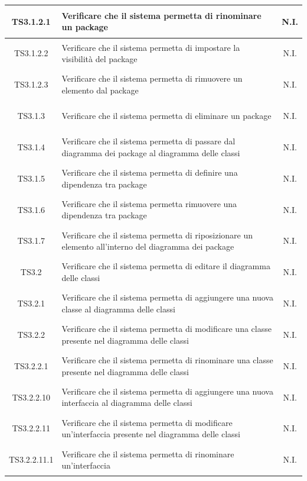 \documentclass[../PianoDiQualifica.tex]{subfiles}
\begin{document}
\begin{longtable}{|c|>{\centering}p{10cm}|c|}
	\hline
	\hypertarget{TS3.1.2.1}{TS3.1.2.1} & Verificare che il sistema permetta di rinominare un package & N.I. \\
	\hline
	\hypertarget{TS3.1.2.2}{TS3.1.2.2} & Verificare che il sistema permetta di impostare la visibilità del package & N.I. \\
	\hline
	\hypertarget{TS3.1.2.3}{TS3.1.2.3} & Verificare che il sistema permetta di rimuovere un elemento dal package & N.I. \\
	\hline
	\hypertarget{TS3.1.3}{TS3.1.3} & Verificare che il sistema permetta di eliminare un package & N.I. \\
	\hline
	\hypertarget{TS3.1.4}{TS3.1.4} & Verificare che il sistema permetta di passare dal diagramma dei package al diagramma delle classi & N.I. \\
	\hline
	\hypertarget{TS3.1.5}{TS3.1.5} & Verificare che il sistema permetta di definire una dipendenza tra package & N.I. \\
	\hline
	\hypertarget{TS3.1.6}{TS3.1.6} & Verificare che il sistema permetta rimuovere una dipendenza tra package & N.I. \\
	\hline
	\hypertarget{TS3.1.7}{TS3.1.7} & Verificare che il sistema permetta di riposizionare un elemento all'interno del diagramma dei package & N.I. \\
	\hline
	\hypertarget{TS3.2}{TS3.2} & Verificare che il sistema permetta di editare il diagramma delle classi & N.I. \\
	\hline
	\hypertarget{TS3.2.1}{TS3.2.1} & Verificare che il sistema permetta di aggiungere una nuova classe al diagramma delle classi & N.I. \\
	\hline
	\hypertarget{TS3.2.2}{TS3.2.2} & Verificare che il sistema permetta di modificare una classe presente nel diagramma delle classi & N.I. \\
	\hline
	\hypertarget{TS3.2.2.1}{TS3.2.2.1} & Verificare che il sistema permetta di rinominare una classe presente nel diagramma delle classi & N.I. \\
	\hline
	\hypertarget{TS3.2.2.10}{TS3.2.2.10} & Verificare che il sistema permetta di aggiungere una nuova interfaccia al diagramma delle classi & N.I. \\
	\hline
	\hypertarget{TS3.2.2.11}{TS3.2.2.11} & Verificare che il sistema permetta di modificare un'interfaccia presente nel diagramma delle classi & N.I. \\
	\hline
	\hypertarget{TS3.2.2.11.1}{TS3.2.2.11.1} & Verificare che il sistema permetta di rinominare un'interfaccia & N.I. \\

\end{longtable}
\end{document}

